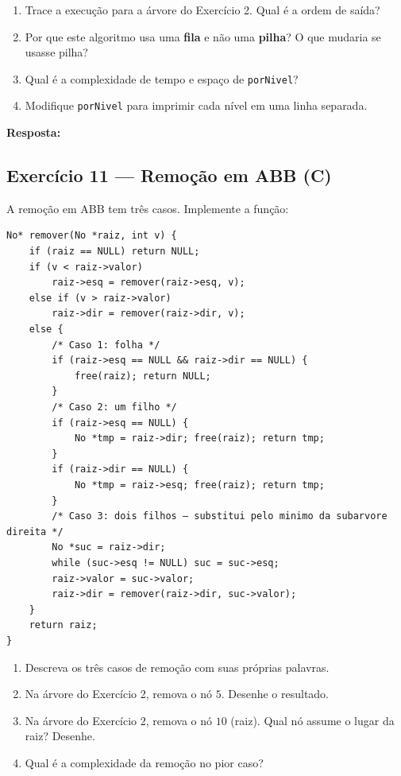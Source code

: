\documentclass[12pt, a4paper]{article}
\newenvironment{resposta}{%
    \begin{mdframed}[linecolor=black!30, backgroundcolor=white,
                     innertopmargin=10pt, innerbottommargin=30pt,
                     skipabove=6pt]
    \textbf{Resposta:}\\[4pt]
}{%
    \end{mdframed}
}
\begin{document}
\begin{enumerate}[label=(\alph*)]
    \item Trace a execução para a árvore do Exercício 2. Qual é a ordem de saída?
    \item Por que este algoritmo usa uma \textbf{fila} e não uma \textbf{pilha}? O que mudaria se usasse pilha?
    \item Qual é a complexidade de tempo e espaço de \texttt{porNivel}?
    \item Modifique \texttt{porNivel} para imprimir cada nível em uma linha separada.
\end{enumerate}

\begin{resposta}
\vspace{5cm}
\end{resposta}

\subsection*{Exercício 11 — Remoção em ABB (C)}

A remoção em ABB tem três casos. Implemente a função:

\begin{lstlisting}[style=cstyle]
No* remover(No *raiz, int v) {
    if (raiz == NULL) return NULL;
    if (v < raiz->valor)
        raiz->esq = remover(raiz->esq, v);
    else if (v > raiz->valor)
        raiz->dir = remover(raiz->dir, v);
    else {
        /* Caso 1: folha */
        if (raiz->esq == NULL && raiz->dir == NULL) {
            free(raiz); return NULL;
        }
        /* Caso 2: um filho */
        if (raiz->esq == NULL) {
            No *tmp = raiz->dir; free(raiz); return tmp;
        }
        if (raiz->dir == NULL) {
            No *tmp = raiz->esq; free(raiz); return tmp;
        }
        /* Caso 3: dois filhos — substitui pelo minimo da subarvore direita */
        No *suc = raiz->dir;
        while (suc->esq != NULL) suc = suc->esq;
        raiz->valor = suc->valor;
        raiz->dir = remover(raiz->dir, suc->valor);
    }
    return raiz;
}
\end{lstlisting}

\begin{enumerate}[label=(\alph*)]
    \item Descreva os três casos de remoção com suas próprias palavras.
    \item Na árvore do Exercício 2, remova o nó $5$. Desenhe o resultado.
    \item Na árvore do Exercício 2, remova o nó $10$ (raiz). Qual nó assume o lugar da raiz? Desenhe.
    \item Qual é a complexidade da remoção no pior caso?
\end{enumerate}
\end{document}
